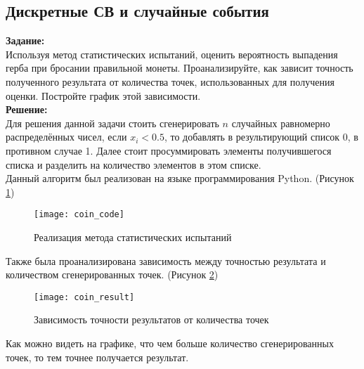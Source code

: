 \subsection*{Дискретные СВ и случайные события}

\textbf{Задание:}\\
Используя метод статистических испытаний, оценить вероятность выпадения герба при бросании правильной монеты. Проанализируйте, как зависит точность полученного результата от количества точек, использованных для получения оценки. Постройте график этой зависимости.\\

\textbf{Решение:}\\
Для решения данной задачи стоить сгенерировать $n$ случайных равномерно распределённых чисел, если $x_i < 0.5$, то добавлять в результирующий список 0, в противном случае 1. Далее стоит просуммировать элементы получившегося списка и разделить на количество элементов в этом списке.\\

Данный алгоритм был реализован на языке программирования Python. (Рисунок \ref{fig:coin_code})
\begin{figure}[h]
	\centering \texttt{[image: coin\_code]}
	\caption{Реализация метода статистических испытаний}
	\label{fig:coin_code}
\end{figure}

Также была проанализирована зависимость между точностью результата и количеством сгенерированных точек. (Рисунок \ref{fig:coin_result})
\begin{figure}[h]
	\centering \texttt{[image: coin\_result]}
	\caption{Зависимость точности результатов от количества точек}
	\label{fig:coin_result}
\end{figure}

Как можно видеть на графике, что чем больше количество сгенерированных точек, то тем точнее получается результат.